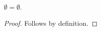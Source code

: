 \begin{proposition}\label{obvious_unused_definition}
    $\emptyset=\emptyset$.
\end{proposition}
\begin{proof}
    Follows by definition.
\end{proof}
